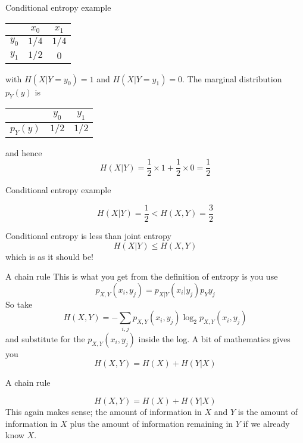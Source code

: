\documentclass{beamer}
\newcommand{\crish}{\color{reddish}}
\newcommand{\cbla}{\color{black}}
\newcommand{\sm}{\color{reddish}$}
\newcommand{\fm}{$\color{black}{}}
\begin{document}
\begin{frame}{Conditional entropy example}
\begin{center}
\color{purple}
    \begin{tabular}{c|cc}
&$x_0$&$x_1$\\
\hline
$y_0$&$1/4$&$1/4$\\
$y_1$&$1/2$&$0$
    \end{tabular}
    \color{black}
\end{center}
with \sm{}H(X|Y=y_0)=1\fm{} and \sm{}H(X|Y=y_1)=0\fm{}. The marginal distribution \sm{}p_Y(y)\fm{} is
\begin{center}
\color{purple}
    \begin{tabular}{c|cc}
  &$y_0$&$y_1$\\
\hline
$p_Y(y)$&$1/2$&$1/2$\\
    \end{tabular}
    \cbla
    \end{center}
and hence
\crish
$$
H(X|Y)=\frac{1}{2}\times 1 + \frac{1}{2}\times 0 =\frac{1}{2}
$$
\cbla
\end{frame}


\begin{frame}{Conditional entropy example}

\crish
$$
H(X|Y)=\frac{1}{2}< H(X,Y) = \frac{3}{2}
$$
\cbla
\end{frame}


\begin{frame}{Conditional entropy is less than joint entropy}
\crish
$$
H(X|Y) \le H(X,Y) 
$$
\cbla
which is as it should be!
\end{frame}

\begin{frame}{A chain rule}
  This is what you get from the definition of entropy is you use
  \crish
  $$
p_{X,Y}(x_i,y_j)=p_{X|Y}(x_i|y_j)p_Y{y_j}
$$
\cbla
So take
\crish
$$
H(X,Y)=-\sum_{i,j} p_{X,Y}(x_i,y_j)\log_2{p_{X,Y}(x_i,y_j)}
$$
\cbla
and substitute for the \sm{}p_{X,Y}(x_i,y_j)\fm{} inside the log. A bit of mathematics gives you
\crish
$$
H(X,Y)=H(X)+H(Y|X)
$$
\cbla
\end{frame}


\begin{frame}{A chain rule}

\crish
$$
H(X,Y)=H(X)+H(Y|X)
$$ \cbla This again makes sense; the amount of information in
\sm{}X\fm{} and \sm{}Y\fm{} is the amount of information in
\sm{}X\fm{} plus the amount of information remaining in \sm{}Y\fm{} if
we already know \sm{}X\fm{}.

\end{frame}
\end{document}
